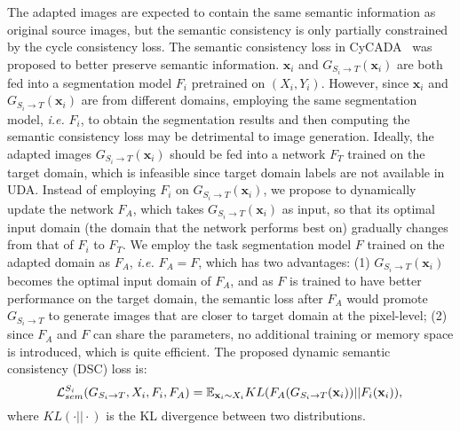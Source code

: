 \documentclass{article}
\begin{document}
The adapted images are expected to contain the same semantic information as original source images, but the semantic consistency is only partially constrained by the cycle consistency loss. The semantic consistency loss in CyCADA~\cite{hoffman2018cycada} was proposed to better preserve semantic information. $\mathbf{x}_i$ and $G_{S_i \rightarrow T}(\mathbf{x}_i)$ are both fed into a segmentation model $F_{i}$ pretrained on $(X_i, Y_i)$. However, since $\mathbf{x}_i$ and $G_{S_i \rightarrow T}(\mathbf{x}_i)$ are from different domains, employing the same segmentation model, \textit{i.e.} $F_{i}$, to obtain the segmentation results and then computing the semantic consistency loss may be detrimental to image generation. Ideally, the adapted images $G_{S_i \rightarrow T}(\mathbf{x}_i)$ should be fed into a network  $F_T$ trained on the target domain, which is infeasible since target domain labels are not available in UDA. Instead of employing $F_{i}$ on $G_{S_i \rightarrow T}(\mathbf{x}_i)$, we propose to dynamically update the network $F_A$, which takes $G_{S_i \rightarrow T}(\mathbf{x}_i)$ as input, so that its optimal input domain (the domain that the network performs best on) gradually changes from that of $F_i$ to $F_T$. We employ the task segmentation model $F$ trained on the adapted domain as $F_A$, \textit{i.e.} $F_A = F$, which has two advantages: (1) $G_{S_i \rightarrow T}(\mathbf{x}_i)$ becomes the optimal input domain of $F_A$, and as $F$ is trained to have better performance on the target domain, the semantic loss after $F_A$ would promote $G_{S_i \rightarrow T}$ to generate images that are closer to target domain at the pixel-level; (2) since $F_A$ and $F$ can share the parameters, no additional training or memory space is introduced, which is quite efficient.
The proposed dynamic semantic consistency (DSC) loss is:
\begin{equation}
\mathcal{L}_{sem}^{S_i}(G_{S_{i}\rightarrow T},X_i,F_{i}, F_{A})=\mathbb{E}_{\mathbf{x}_{i}\sim X_i}KL(F_{A}(G_{S_{i}\rightarrow T}(\mathbf{x}_{i}))||F_{i}(\mathbf{x}_{i})),\\
\label{equ:semConsisSi}
\end{equation}
where $KL(\cdot||\cdot)$ is the KL divergence between two distributions.
\end{document}

